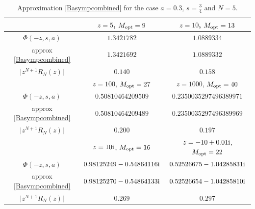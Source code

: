\documentclass[pdftex]{sigma}
\numberwithin{equation}{section}
\def\iunit{{\rm i}}
\begin{document}
\begin{table}[ht]\renewcommand{\arraystretch}{1.2}
\begin{center}
\begin{tabular}{|c|c|c|}
\hline
 & $z=5$, $M_{\rm opt}=9$
 & $z=10$, $M_{\rm opt}=13$ \\
\hline
$\Phi(-z,s,a)$
& $1.3421782$
& $1.0889334$\\

approx \eqref{Basympcombined}
& $1.3421692$
& $1.0889332$\\

$\bigl|z^{N+1}R_N(z)\bigr|$
& $0.140$
& $0.158$\\
\hline
 & $z=100$, $M_{\rm opt}=27$
 & $z=1000$, $M_{\rm opt}=40$ \\
\hline
$\Phi(-z,s,a)$
& $0.50810464209509$
& $0.2350035297496389971$\\

approx \eqref{Basympcombined}
& $0.50810464209489$
& $0.2350035297496389969$\\

$\bigl|z^{N+1}R_N(z)\bigr|$
& $0.200$
& $0.197$\\
\hline
 & $z=10\iunit$, $M_{\rm opt}=16$
 & $z=-10+0.01\iunit$, $M_{\rm opt}=22$ \\
\hline
$\Phi(-z,s,a)$
& $0.98125249 - 0.54864116\iunit$
& $0.52526675 - 1.04285831\iunit$\\

approx \eqref{Basympcombined}
& $0.98125270 - 0.54864133\iunit$
& $0.52526654 - 1.04285810\iunit$\\

$\bigl|z^{N+1}R_N(z)\bigr|$
& $0.269$
& $0.297$\\

\hline
\end{tabular}
\caption{Approximation \eqref{Basympcombined} for the case $a=0.3$, $s=\frac34$
and $N=5$.}
\label{tab:combined}
\end{center}
\end{table}%
\end{document}
